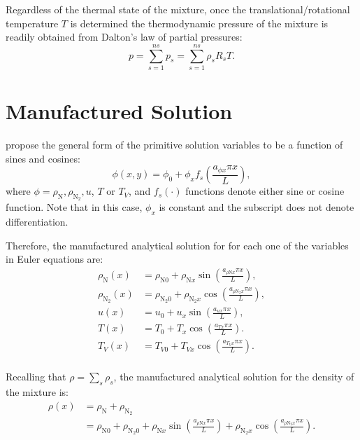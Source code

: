 \documentclass[10pt]{article}
\begin{document}
Regardless of the thermal state of the mixture, once the translational/rotational temperature $T$ is determined the thermodynamic pressure of the mixture is readily obtained from Dalton's law of partial pressures:
\begin{equation}
 p = \sum_{s=1}^{ns} p_s = \sum_{s=1}^{ns} \rho_s R_s T .
 \label{eq:p_eq_state}
\end{equation}


\section{Manufactured Solution}

\citet{Roy2002} propose the general form of the primitive solution variables to be a function of sines and cosines:
\begin{equation}
 \label{eq:manufactured01}
 \phi (x,y) = \phi_0+ \phi_x f_s\left(\frac{a_{\phi x} \pi x}{L}\right) ,
\end{equation}
where $\phi=\rho_{\text{N}},\rho_{\text{N}_2}, u$, $T$ or $T_V$, and $f_s(\cdot)$ functions denote either sine or cosine function. Note that in this case, $\phi_x$ is constant and the subscript does not denote differentiation.

Therefore, the manufactured analytical solution for for each one of the variables in Euler equations are:
\begin{equation}
\begin{split}
\label{eq:manufactured02}
\rho_{\text{N}}(x) &= \rho_{\text{N}0} + \rho_{\text{N}x} \sin\left(\frac{a_{\rho \text{N} x}\pi x}{L}\right),\\
\rho_{\text{N}_2}(x) &= \rho_{\text{N}_2 0}+ \rho_{\text{N}_2 x} \cos\left(\frac{a_{ \rho \text{N}_2 x } \pi x}{L}\right),\\
u(x) &= u_{0}+u_{x} \sin\left(\frac{a_{u x} \pi x}{L}\right),\\
T(x) &= T_{0}+T_{x} \cos\left(\frac{a_{T x} \pi x}{L}\right).\\
T_V(x) &= T_{V0}+T_{Vx} \cos\left(\frac{a_{T_V x} \pi x}{L}\right).\\
\end{split}
\end{equation}

Recalling that $\rho=\sum_s \rho_s$, the manufactured analytical solution for the density of the mixture  is:
\begin{equation}
\label{eq:manufactured03}
\begin{split}
\rho(x) &= \rho_{\text{N}}+\rho_{\text{N}_2}\\
                     &= \rho_{\text{N}0} + \rho_{\text{N}_2 0} +
\rho_{\text{N}x} \sin\left(\frac{a_{  \rho \text{N} x }\pi x}{L}\right) + \rho_{\text{N}_2 x} \cos\left(\frac{a_{ \rho \text{N}_2 x } \pi x}{L}\right) .
\end{split}
\end{equation}
\end{document}
